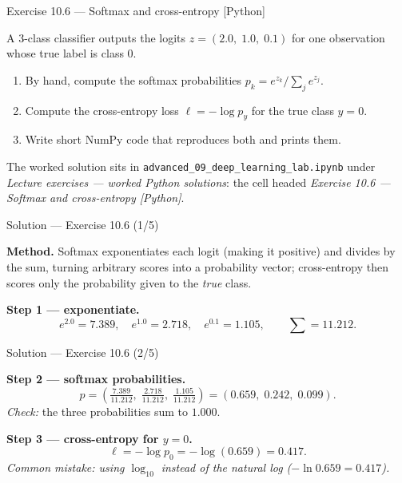 \documentclass[aspectratio=169,11pt]{beamer}
\begin{document}
\begin{frame}[fragile]{Exercise 10.6 --- Softmax and cross-entropy [Python]}
\begin{exercise}
  A 3-class classifier outputs the logits
  $z = (2.0,\; 1.0,\; 0.1)$ for one observation whose true label is
  class $0$.
  \begin{enumerate}
    \item By hand, compute the softmax probabilities
          $p_k = e^{z_k} / \sum_j e^{z_j}$.
    \item Compute the cross-entropy loss
          $\ell = -\log p_{y}$ for the true class $y = 0$.
    \item Write short NumPy code that reproduces both and prints them.
  \end{enumerate}
\end{exercise}
\begin{labnote}
  The worked solution sits in \texttt{advanced\_09\_deep\_learning\_lab.ipynb} under
  \emph{Lecture exercises --- worked Python solutions}: the cell headed
  \emph{Exercise 10.6 --- Softmax and cross-entropy [Python]}.
\end{labnote}
\end{frame}

\begin{frame}{Solution --- Exercise 10.6 (1/5)}
\begin{solutionbox}
  \textbf{Method.} Softmax exponentiates each logit (making it positive) and
  divides by the sum, turning arbitrary scores into a probability vector;
  cross-entropy then scores only the probability given to the \emph{true} class.

  \smallskip
  \textbf{Step 1 --- exponentiate.}
  \[
    e^{2.0} = 7.389,\quad e^{1.0} = 2.718,\quad e^{0.1} = 1.105,
    \qquad \textstyle\sum = 11.212 .
  \]
\end{solutionbox}
\end{frame}

\begin{frame}{Solution --- Exercise 10.6 (2/5)}
\begin{solutionbox}
  \textbf{Step 2 --- softmax probabilities.}
  \[
    p = \left(\tfrac{7.389}{11.212},\; \tfrac{2.718}{11.212},\;
              \tfrac{1.105}{11.212}\right)
      = (0.659,\; 0.242,\; 0.099).
  \]
  \emph{Check:} the three probabilities sum to $1.000$.

  \smallskip
  \textbf{Step 3 --- cross-entropy for $y = 0$.}
  \[
    \ell = -\log p_0 = -\log(0.659) = 0.417 .
  \]
  \textit{Common mistake: using $\log_{10}$ instead of the natural log ($-\ln 0.659 = 0.417$).}
\end{solutionbox}
\end{frame}
\end{document}
